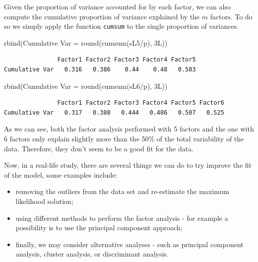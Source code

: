 \documentclass[
  letterpaper,
  DIV=11,
  numbers=noendperiod]{scrartcl}
\newenvironment{Shaded}{\begin{snugshade}}{\end{snugshade}}
\newcommand{\AttributeTok}[1]{\textcolor[rgb]{0.40,0.45,0.13}{#1}}
\newcommand{\FunctionTok}[1]{\textcolor[rgb]{0.28,0.35,0.67}{#1}}
\newcommand{\NormalTok}[1]{\textcolor[rgb]{0.00,0.23,0.31}{#1}}
\newcommand{\OtherTok}[1]{\textcolor[rgb]{0.00,0.23,0.31}{#1}}
\newcommand{\SpecialCharTok}[1]{\textcolor[rgb]{0.37,0.37,0.37}{#1}}
\newcommand{\StringTok}[1]{\textcolor[rgb]{0.13,0.47,0.30}{#1}}
\providecommand{\tightlist}{%
  \setlength{\itemsep}{0pt}\setlength{\parskip}{0pt}}\usepackage{longtable,booktabs,array}
\begin{document}
Given the proportion of variance accounted for by each factor, we can
also compute the cumulative proportion of variance explained by the
\(m\) factors. To do so we simply apply the function \texttt{cumsum} to
the single proportion of variances.

\begin{Shaded}
\begin{Highlighting}[]
\FunctionTok{rbind}\NormalTok{(}\StringTok{\textasciigrave{}}\AttributeTok{Cumulative Var}\StringTok{\textasciigrave{}} \OtherTok{=} \FunctionTok{round}\NormalTok{(}\FunctionTok{cumsum}\NormalTok{(sL5}\SpecialCharTok{/}\NormalTok{p), 3L))}
\end{Highlighting}
\end{Shaded}

\begin{verbatim}
               Factor1 Factor2 Factor3 Factor4 Factor5
Cumulative Var   0.316   0.386    0.44    0.48   0.503
\end{verbatim}

\begin{Shaded}
\begin{Highlighting}[]
\FunctionTok{rbind}\NormalTok{(}\StringTok{\textasciigrave{}}\AttributeTok{Cumulative Var}\StringTok{\textasciigrave{}} \OtherTok{=} \FunctionTok{round}\NormalTok{(}\FunctionTok{cumsum}\NormalTok{(sL6}\SpecialCharTok{/}\NormalTok{p), 3L))}
\end{Highlighting}
\end{Shaded}

\begin{verbatim}
               Factor1 Factor2 Factor3 Factor4 Factor5 Factor6
Cumulative Var   0.317   0.388   0.444   0.486   0.507   0.525
\end{verbatim}

As we can see, both the factor analysis performed with 5 factors and the
one with 6 factors only explain slightly more than the 50\% of the total
variability of the data. Therefore, they don't seem to be a good fit for
the data.

Now, in a real-life study, there are several things we can do to try
improve the fit of the model, some examples include:

\begin{itemize}
\tightlist
\item
  removing the outliers from the data set and re-estimate the maximum
  likelihood solution;
\item
  using different methods to perform the factor analysis - for example a
  possibility is to use the principal component approach;
\item
  finally, we may consider alternative analyses - such as principal
  component analysis, cluster analysis, or discriminant analysis.
\end{itemize}
\end{document}
